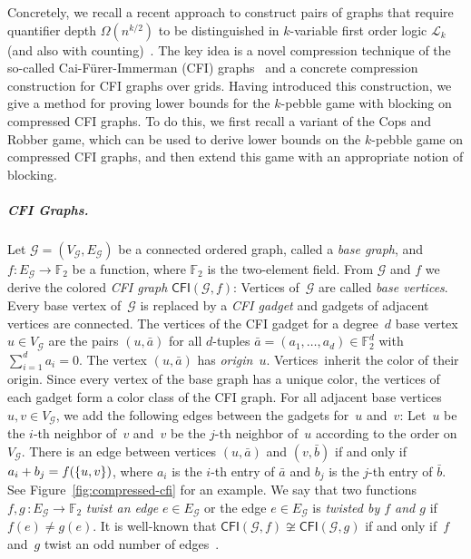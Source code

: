 \documentclass[a4paper,english, thm-restate]{lipics-v2021}
\newcommand{\defining}[1]{\emph{#1}}
\DeclarePairedDelimiter\set{\lbrace}{\rbrace}
\newcommand{\CFIsym}{\mathsf{CFI}}
\newcommand{\CFI}[1]{\CFIsym(#1)}
\newcommand{\FF}{\mathbb{F}}
\newcommand{\tup}[1]{\bar{#1}}
\newcommand{\iso}{\cong}
\newcommand{\klogic}[1]{\mathscr{L}_{#1}}
\newcommand{\graphG}{\mathcal{G}}
\newcommand{\vertexG}{V_{\graphG}}
\newcommand{\edgeG}{E_{\graphG}}
\newcommand{\confORfull}[2]{#1}
\begin{document}
Concretely, we recall a recent approach to construct pairs of graphs that
require quantifier depth $\Omega(n^{k/2})$
to be distinguished in
$k$-variable first order logic $\klogic{k}$ (and also with counting)~\cite{DBLP:conf/focs/GroheLNS23}.
The key idea is a novel compression technique of the so-called Cai-Fürer-Immerman (CFI) graphs~\cite{CaiFuererImmerman1992} and a concrete compression construction for CFI graphs over grids. Having introduced this construction, we give a method for proving lower bounds for the $k$-pebble game with blocking on compressed CFI graphs. To do this, we first recall a variant of the Cops and Robber game, which can be used to derive lower bounds on the $k$-pebble game on compressed CFI graphs, and then extend this game with an appropriate notion of blocking. 
%
%
%

\confORfull{}{\subsection{CFI Graphs, Compressions, and the Cops and Robber Game}}
\subparagraph*{CFI Graphs.}
Let $\graphG =(\vertexG, \edgeG)$ be a connected ordered graph, called a \defining{base graph},
and $f \colon \edgeG \to \FF_2$ be a function,
where $\FF_2$ is the two-element field.
From $\graphG$ and $f$
we derive the colored \defining{CFI graph} $\CFI{\graphG,f}$:
Vertices of~$\graphG$ are called \defining{base vertices}.
Every base vertex of~$\graphG$ is replaced by a \defining{CFI gadget}
and gadgets of adjacent vertices are connected.
The vertices of the CFI gadget for a degree~$d$ base vertex $u\in \vertexG$
are the pairs $(u,\tup{a})$ for all $d$-tuples $\tup{a} =(a_1, \dots, a_d) \in \FF_2^d$ with$\sum_{i=1}^d a_i = 0$.
The vertex $(u,\tup{a})$ has \defining{origin}~$u$. Vertices~inherit the color of their origin.
Since every vertex of the base graph has a unique color, the vertices of each gadget form a color class of the CFI graph.
For all adjacent base vertices $u,v \in \vertexG$,
we add the following edges between the gadgets for~$u$ and~$v$:
Let~$u$ be the $i$-th neighbor of~$v$
and~$v$ be the $j$-th neighbor of~$u$ according to the order on $\vertexG$.
There is an edge between vertices $(u, \tup{a})$ and $(v, \tup{b})$ if and only if $a_i + b_j = f(\set{u,v})$,
where $a_i$ is the $i$-th entry of $\tup{a}$ and $b_j$ is the $j$-th entry of $\tup{b}$. See Figure~\ref{fig:compressed-cfi} for an example.
We say that two functions $f,g \, \colon \edgeG \to \FF_2$
\defining{twist an edge} $e \in \edgeG$
or the edge $e\in \edgeG$ is \defining{twisted by $f$ and $g$}
if $f(e) \neq g(e)$.
It is well-known that $\CFI{\graphG,f} \not\iso\CFI{\graphG,g}$
if and only if~$f$ and~$g$ twist an odd number of edges~\cite{CaiFuererImmerman1992}.
\end{document}
